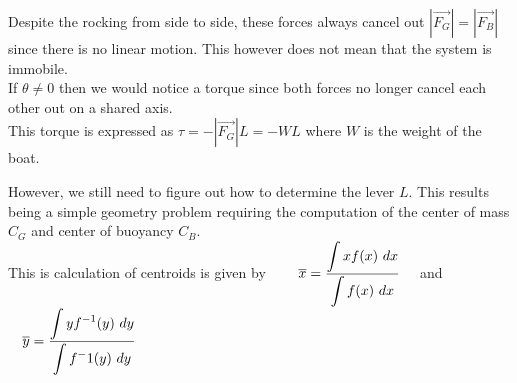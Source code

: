 \documentclass[11pt, openright]{book}
\begin{document}
Despite the rocking from side to side, these forces always cancel out $|\overrightarrow{F_G}|=|\overrightarrow{F_B}|$ since there is no linear motion. This however does not mean that the system is immobile.\\
If $\theta\neq0$ then we would notice a torque since both forces no longer cancel each other out on a shared axis.\\
This torque is expressed as $\tau=-|\overrightarrow{F_G}|L=-WL$ where $W$ is the weight of the boat.

However, we still need to figure out how to determine the lever $L$. This results being a simple geometry problem requiring the computation of the center of mass $C_G$ and center of buoyancy $C_B$.\\

This is calculation of centroids is given by $\qquad\ds{\overline{x}=\frac{\ds{\int xf(x)\ dx}}{\ds{\int f(x)\ dx}}}\quad$ and $\quad\ds{\overline{y}=\frac{\ds{\int yf^{-1}(y)\ dy}}{\ds{\int f^-1(y)\ dy}}}$
\end{document}

